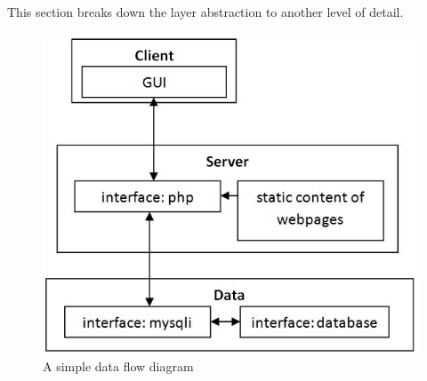 This section breaks down the layer abstraction to another level of detail. 

\begin{figure}[h!]
	\centering
 	\includegraphics[width=\textwidth]{images/LayerBlockDiagramWithSubsystems}
 \caption{A simple data flow diagram}
\end{figure}
